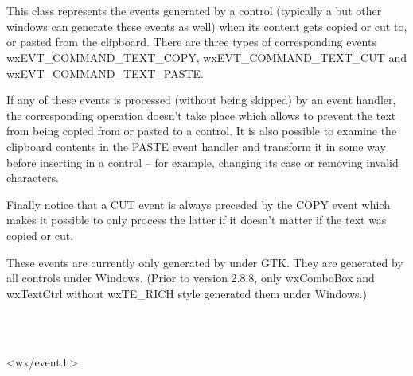 
\section{}\label{wxclipboardtextevent}

This class represents the events generated by a control (typically a 
 but other windows can generate these events as
well) when its content gets copied or cut to, or pasted from the clipboard.
There are three types of corresponding events wxEVT\_COMMAND\_TEXT\_COPY,
wxEVT\_COMMAND\_TEXT\_CUT and wxEVT\_COMMAND\_TEXT\_PASTE.

If any of these events is processed (without being skipped) by an event
handler, the corresponding operation doesn't take place which allows to prevent
the text from being copied from or pasted to a control. It is also possible to
examine the clipboard contents in the PASTE event handler and transform it in
some way before inserting in a control -- for example, changing its case or
removing invalid characters.

Finally notice that a CUT event is always preceded by the COPY event which
makes it possible to only process the latter if it doesn't matter if the text
was copied or cut.


These events are currently only generated by 
under GTK. They are generated by all controls under Windows. (Prior to version
2.8.8, only wxComboBox and wxTextCtrl without wxTE\_RICH style generated them
under Windows.)



\\
\\




<wx/event.h>



